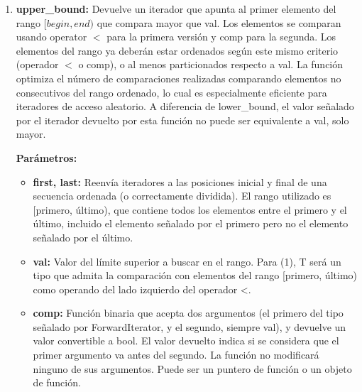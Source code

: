 \begin{enumerate}
\begin{lstlisting}[language=C++]
int main () {
   int myints[] = {10,20,30,30,20,10,10,20};
   std::vector<int> v(myints,myints+8);           // 10 20 30 30 20 10 10 20
	
   std::sort (v.begin(), v.end());                // 10 10 10 20 20 20 30 30
	
   std::vector<int>::iterator low,up;
   low=std::lower_bound (v.begin(), v.end(), 20); //          ^
   up= std::upper_bound (v.begin(), v.end(), 20); //                   ^
	
   std::cout << "limite inferior en la posicion " << (low- v.begin()) << '\n';
   std::cout << "limite superior en la posicion " << (up - v.begin()) << '\n';
   
   return 0;
}
\end{lstlisting}


\item \textbf{upper\_bound:} Devuelve un iterador que apunta al primer elemento del rango $[begin, end)$ que compara mayor que val. Los elementos se comparan usando operator $<$ para la primera versión y comp para la segunda. Los elementos del rango ya deberán estar ordenados según este mismo criterio (operador $<$ o comp), o al menos particionados respecto a val. La función optimiza el número de comparaciones realizadas comparando elementos no consecutivos del rango ordenado, lo cual es especialmente eficiente para iteradores de acceso aleatorio. A diferencia de lower\_bound, el valor señalado por el iterador devuelto por esta función no puede ser equivalente a val, solo mayor.

\textbf{Parámetros:}

\begin{itemize}
	\item \textbf{first, last:} Reenvía iteradores a las posiciones inicial y final de una secuencia ordenada (o correctamente dividida). El rango utilizado es [primero, último), que contiene todos los elementos entre el primero y el último, incluido el elemento señalado por el primero pero no el elemento señalado por el último.
	
	
	\item \textbf{val:} Valor del límite superior a buscar en el rango.
	Para (1), T será un tipo que admita la comparación con elementos del rango [primero, último) como operando del lado izquierdo del operador <.
	
	\item \textbf{comp:}  Función binaria que acepta dos argumentos (el primero del tipo señalado por ForwardIterator, y el segundo, siempre val), y devuelve un valor convertible a bool. El valor devuelto indica si se considera que el primer argumento va antes del segundo. La función no modificará ninguno de sus argumentos. Puede ser un puntero de función o un objeto de función.
\end{itemize} 


\end{enumerate}
